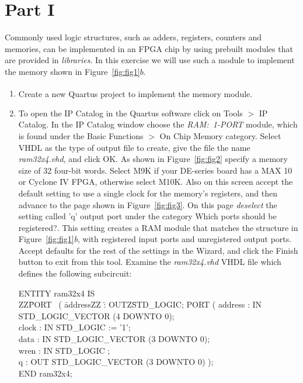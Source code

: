 \documentclass[epsfig,10pt,fullpage]{article}
\begin{document}
\section*{Part I}
Commonly used logic structures, such as adders, registers, counters and memories, 
can be implemented in an FPGA chip by using prebuilt modules that are provided in 
{\it libraries}.  In this exercise we will use such a module to implement the memory 
shown in Figure~\ref{fig:fig1}$b$.

\begin{enumerate}
\item Create a new Quartus\textsuperscript{\textregistered} project to implement the memory module.

\item To open the IP Catalog in the Quartus software click on {\sf Tools} $>$ {\sf IP Catalog}. 
In the IP Catalog window choose the {\it RAM:~1-PORT} module, which is found under 
the {\sf Basic Functions $>$  On Chip Memory} category.  Select {\sf VHDL} as the type 
of output file to create, give the file the name {\it ram32x4.vhd}, and click {\sf OK}. 
As shown in Figure~\ref{fig:fig2} specify a memory size of 32 four-bit words. Select M9K if 
your DE-series board has a MAX 10 or Cyclone IV FPGA, otherwise select M10K. 
Also on this screen accept the default setting to use a single clock for the memory's registers,
and then advance to the page shown in Figure~\ref{fig:fig3}. On this page {\it deselect} the 
setting called {\sf 'q' output port} under the category {\sf Which ports should be registered?}.
This setting creates a RAM module that matches the structure in Figure~\ref{fig:fig1}{\it b}, 
with registered input ports and unregistered output ports. Accept defaults for the rest of 
the settings in the Wizard, and click the {\sf Finish} button to exit from this tool.  Examine the 
{\it ram32x4.vhd} VHDL file which defines the following subcircuit:

\begin{center}
\begin{tabbing}
ENTITY ram32x4 IS\\
ZZ\=PORT ~( \=addressZZ \=: OUTZ\=STD\_LOGIC;\kill
\>PORT ( \>address \>: IN \>STD\_LOGIC\_VECTOR (4 DOWNTO 0);\\
\>\>clock \>: IN \>STD\_LOGIC  := '1';\\
\>\>data	\>: IN \>STD\_LOGIC\_VECTOR (3 DOWNTO 0);\\
\>\>wren	\>: IN \>STD\_LOGIC ;\\
\>\>q	\>: OUT \>STD\_LOGIC\_VECTOR (3 DOWNTO 0) );\\
END ram32x4;\\
\end{tabbing}
\end{center}


\end{enumerate}
\end{document}
